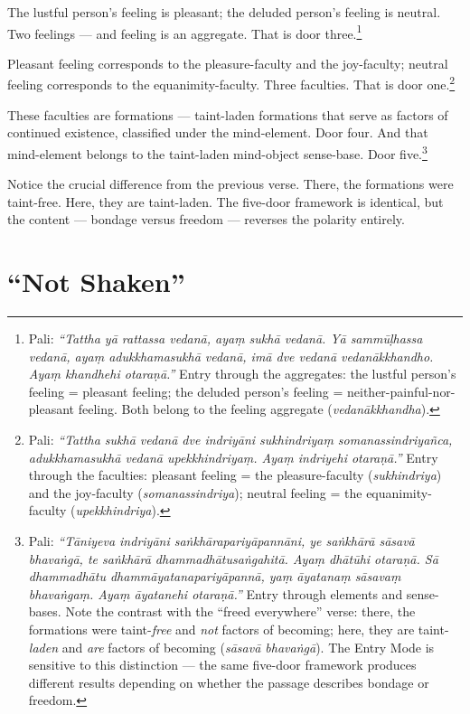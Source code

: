 The lustful person's feeling is pleasant; the deluded person's feeling is neutral. Two feelings --- and feeling is an aggregate. That is door three.\footnote{Pali: \textit{``Tattha yā rattassa vedanā, ayaṃ sukhā vedanā. Yā sammūḷhassa vedanā, ayaṃ adukkhamasukhā vedanā, imā dve vedanā vedanākkhandho. Ayaṃ khandhehi otaraṇā.''} Entry through the aggregates: the lustful person's feeling = pleasant feeling; the deluded person's feeling = neither-painful-nor-pleasant feeling. Both belong to the feeling aggregate (\textit{vedanākkhandha}).}

Pleasant feeling corresponds to the pleasure-faculty and the joy-faculty; neutral feeling corresponds to the equanimity-faculty. Three faculties. That is door one.\footnote{Pali: \textit{``Tattha sukhā vedanā dve indriyāni sukhindriyaṃ somanassindriyañca, adukkhamasukhā vedanā upekkhindriyaṃ. Ayaṃ indriyehi otaraṇā.''} Entry through the faculties: pleasant feeling = the pleasure-faculty (\textit{sukhindriya}) and the joy-faculty (\textit{somanassindriya}); neutral feeling = the equanimity-faculty (\textit{upekkhindriya}).}

These faculties are formations --- taint-laden formations that serve as factors of continued existence, classified under the mind-element. Door four. And that mind-element belongs to the taint-laden mind-object sense-base. Door five.\footnote{Pali: \textit{``Tāniyeva indriyāni saṅkhārapariyāpannāni, ye saṅkhārā sāsavā bhavaṅgā, te saṅkhārā dhammadhātusaṅgahitā. Ayaṃ dhātūhi otaraṇā. Sā dhammadhātu dhammāyatanapariyāpannā, yaṃ āyatanaṃ sāsavaṃ bhavaṅgaṃ. Ayaṃ āyatanehi otaraṇā.''} Entry through elements and sense-bases. Note the contrast with the ``freed everywhere'' verse: there, the formations were taint-\textit{free} and \textit{not} factors of becoming; here, they are taint-\textit{laden} and \textit{are} factors of becoming (\textit{sāsavā bhavaṅgā}). The Entry Mode is sensitive to this distinction --- the same five-door framework produces different results depending on whether the passage describes bondage or freedom.}

Notice the crucial difference from the previous verse. There, the formations were taint-free. Here, they are taint-laden. The five-door framework is identical, but the content --- bondage versus freedom --- reverses the polarity entirely.

\section*{``Not Shaken''}

